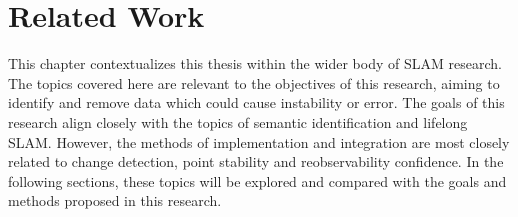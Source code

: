 \section{Related Work}
\label{sec:related_work}

This chapter contextualizes this thesis within the wider body of SLAM research. The topics covered here are relevant to the objectives of this research, aiming to identify and remove data which could cause instability or error. The goals of this research align closely with the topics of semantic identification and lifelong SLAM. However, the methods of implementation and integration are most closely related to change detection, point stability and reobservability confidence. In the following sections, these topics will be explored and compared with the goals and methods proposed in this research.

% 